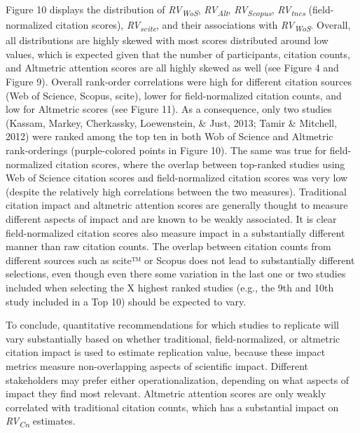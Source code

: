 \documentclass[
  man,floatsintext]{apa6}
\begin{document}
Figure 10 displays the distribution of \emph{RV\textsubscript{WoS}}, \emph{RV\textsubscript{Alt}}, \emph{RV\textsubscript{Scopus}}, \emph{RV\textsubscript{tncs}} (field-normalized citation scores), \emph{RV\textsubscript{scite}}, and their associations with \emph{RV\textsubscript{WoS}}. Overall, all distributions are highly skewed with most scores distributed around low values, which is expected given that the number of participants, citation counts, and Altmetric attention scores are all highly skewed as well (see Figure 4 and Figure 9). Overall rank-order correlations were high for different citation sources (Web of Science, Scopus, scite), lower for field-normalized citation counts, and low for Altmetric scores (see Figure 11). As a consequence, only two studies (Kassam, Markey, Cherkassky, Loewenstein, \& Just, 2013; Tamir \& Mitchell, 2012) were ranked among the top ten in both Wob of Science and Altmetric rank-orderings (purple-colored points in Figure 10). The same was true for field-normalized citation scores, where the overlap between top-ranked studies using Web of Science citation scores and field-normalized citation scores was very low (despite the relatively high correlations between the two measures). Traditional citation impact and altmetric attention scores are generally thought to measure different aspects of impact and are known to be weakly associated. It is clear field-normalized citation scores also measure impact in a substantially different manner than raw citation counts. The overlap between citation counts from different sources such as scite™ or Scopus does not lead to substantially different selections, even though even there some variation in the last one or two studies included when selecting the X highest ranked studies (e.g., the 9th and 10th study included in a Top 10) should be expected to vary.

To conclude, quantitative recommendations for which studies to replicate will vary substantially based on whether traditional, field-normalized, or altmetric citation impact is used to estimate replication value, because these impact metrics measure non-overlapping aspects of scientific impact. Different stakeholders may prefer either operationalization, depending on what aspects of impact they find most relevant. Altmetric attention scores are only weakly correlated with traditional citation counts, which has a substantial impact on \emph{RV\textsubscript{Cn}} estimates.
\end{document}
